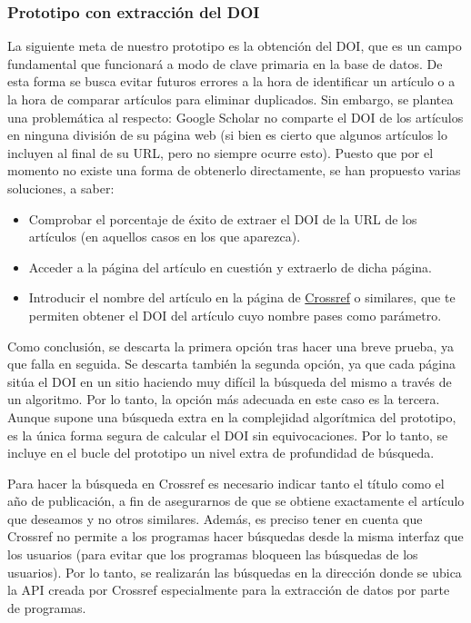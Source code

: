 \subsubsection{Prototipo con extracción del DOI}

La siguiente meta de nuestro prototipo es la obtención del DOI, que es un campo fundamental que funcionará a modo de clave primaria en la base de datos. De esta forma se busca evitar futuros errores a la hora de identificar un artículo o a la hora de comparar artículos para eliminar duplicados. Sin embargo, se plantea una problemática al respecto: Google Scholar no comparte el DOI de los artículos en ninguna división de su página web (si bien es cierto que algunos artículos lo incluyen al final de su URL, pero no siempre ocurre esto). Puesto que por el momento no existe una forma de obtenerlo directamente, se han propuesto varias soluciones, a saber:
\begin{itemize}
	\item Comprobar el porcentaje de éxito de extraer el DOI de la URL de los artículos (en aquellos casos en los que aparezca).
	\item Acceder a la página del artículo en cuestión y extraerlo de dicha página.
         \item Introducir el nombre del artículo en la página de \href{https://www.crossref.org/}{Crossref} o similares, que te permiten obtener el DOI del artículo cuyo nombre pases como parámetro.
\end{itemize}
Como conclusión, se descarta la primera opción tras hacer una breve prueba, ya que falla en seguida. Se descarta también la segunda opción, ya que cada página sitúa el DOI en un sitio haciendo muy difícil la búsqueda del mismo a través de un algoritmo. Por lo tanto, la opción más adecuada en este caso es la tercera. Aunque supone una búsqueda extra en la complejidad algorítmica del prototipo, es la única forma segura de calcular el DOI sin equivocaciones. Por lo tanto, se incluye en el bucle del prototipo un nivel extra de profundidad de búsqueda.

Para hacer la búsqueda en Crossref es necesario indicar tanto el título como el año de publicación, a fin de asegurarnos de que se obtiene exactamente el artículo que deseamos y no otros similares. Además, es preciso tener en cuenta que Crossref no permite a los programas hacer búsquedas desde la misma interfaz que los usuarios (para evitar que los programas bloqueen las búsquedas de los usuarios). Por lo tanto, se realizarán las búsquedas en la dirección donde se ubica la API creada por Crossref especialmente para la extracción de datos por parte de programas.

